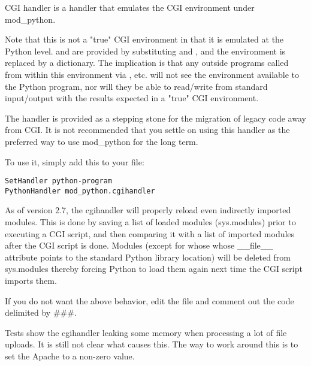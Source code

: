 
CGI handler is a handler that emulates the CGI environment under mod_python. 

Note that this is not a "true" CGI environment in that it is emulated
at the Python level.  and  are provided by
substituting  and , and the environment
is replaced by a dictionary. The implication is that any outside programs
called from within this environment via , etc. will
not see the environment available to the Python program, nor will they
be able to read/write from standard input/output with the results expected
in a "true" CGI environment.

The handler is provided as a stepping stone for the migration of legacy
code away from CGI. It is not recommended that you settle on using
this handler as the preferred way to use mod_python for the long term.

To use it, simply add this to your  file: 

\begin{verbatim}
SetHandler python-program
PythonHandler mod_python.cgihandler
\end{verbatim}

As of version 2.7, the cgihandler will properly reload even indirectly
imported modules. This is done by saving a list of loaded modules
(sys.modules) prior to executing a CGI script, and then comparing it
with a list of imported modules after the CGI script is done.  Modules
(except for whose whose __file__ attribute points to the standard
Python library location) will be deleted from sys.modules thereby
forcing Python to load them again next time the CGI script imports
them.

If you do not want the above behavior, edit the 
file and comment out the code delimited by \#\#\#.

Tests show the cgihandler leaking some memory when processing a lot of
file uploads. It is still not clear what causes this. The way to work
around this is to set the Apache  to a non-zero
value.


